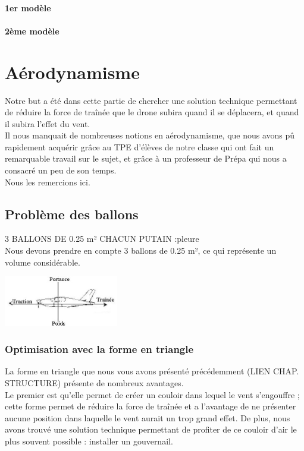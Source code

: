 \documentclass[a4paper,11pt]{article}
\begin{document}
\paragraph{1er modèle}

\paragraph{2ème modèle}


\section{Aérodynamisme}
	Notre but a été dans cette partie de chercher une solution technique permettant de réduire la force de traînée que le drone subira quand il se déplacera, et quand il subira l'effet du vent. \\
	Il nous manquait de nombreuses notions en aérodynamisme, que nous avons pû rapidement acquérir grâce au TPE d'élèves de notre classe qui ont fait un remarquable travail sur le sujet, et grâce à un professeur de Prépa qui nous a consacré un peu de son temps.\\
	Nous les remercions ici.
\subsection{Problème des ballons}
	3 BALLONS DE 0.25 m² CHACUN PUTAIN :pleure\\
	Nous devons prendre en compte 3 ballons de 0.25 m², ce qui représente un volume considérable.\\
	\begin{center}
		\includegraphics[width=5cm]{../Images/portance.jpg}
	\end{center}
\subsubsection{Optimisation avec la forme en triangle}
	La forme en triangle que nous vous avons présenté précédemment (LIEN CHAP. STRUCTURE) présente de nombreux avantages.
	\\
	Le premier est qu'elle permet de créer un couloir dans lequel le vent s'engouffre ; cette forme permet de réduire la force de traînée et a l'avantage de ne présenter aucune position dans laquelle le vent aurait un trop grand effet.
	De plus, nous avons trouvé une solution technique permettant de profiter de ce couloir d'air le plus souvent possible : installer un gouvernail.
\end{document}
